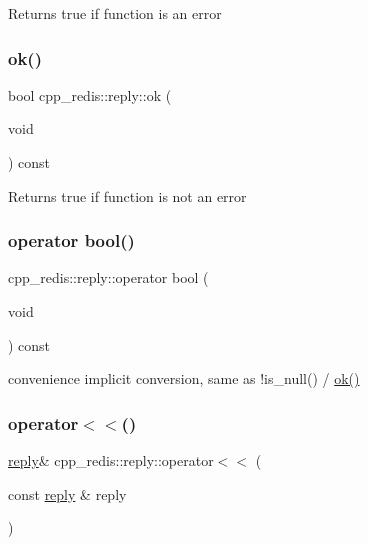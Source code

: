 \begin{DoxyReturn}{Returns}
true if function is an error 
\end{DoxyReturn}
\mbox{\label{classcpp__redis_1_1reply_a1270c4197e0ce79df996565f44011ac0}} 
\subsubsection{\texorpdfstring{ok()}{ok()}}
{\footnotesize\ttfamily bool cpp\+\_\+redis\+::reply\+::ok (\begin{DoxyParamCaption}\item[{void}]{ }\end{DoxyParamCaption}) const}

\begin{DoxyReturn}{Returns}
true if function is not an error 
\end{DoxyReturn}
\mbox{\label{classcpp__redis_1_1reply_a74ef4651c068bfc68436f7e3c7a9a2e6}} 
\subsubsection{\texorpdfstring{operator bool()}{operator bool()}}
{\footnotesize\ttfamily cpp\+\_\+redis\+::reply\+::operator bool (\begin{DoxyParamCaption}\item[{void}]{ }\end{DoxyParamCaption}) const}

convenience implicit conversion, same as !is\+\_\+null() / \mbox{\hyperlink{classcpp__redis_1_1reply_a1270c4197e0ce79df996565f44011ac0}{ok()}} \mbox{\label{classcpp__redis_1_1reply_a4f2a05711b5db6b53108cb9eec4e19be}} 
\subsubsection{\texorpdfstring{operator$<$$<$()}{operator<<()}}
{\footnotesize\ttfamily \mbox{\hyperlink{classcpp__redis_1_1reply}{reply}}\& cpp\+\_\+redis\+::reply\+::operator$<$$<$ (\begin{DoxyParamCaption}\item[{const \mbox{\hyperlink{classcpp__redis_1_1reply}{reply}} \&}]{reply }\end{DoxyParamCaption})}

